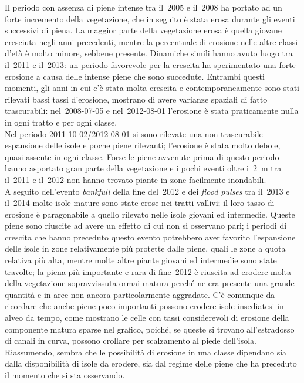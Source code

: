 Il periodo con assenza di piene intense tra il~2005 e il~2008 ha portato ad un forte incremento della vegetazione, che in seguito è stata erosa durante gli eventi successivi di piena.
La maggior parte della vegetazione erosa è quella giovane cresciuta negli anni precedenti, mentre la percentuale di erosione nelle altre classi d'età è molto minore, sebbene presente.
Dinamiche simili hanno avuto luogo tra il~2011 e il~2013: un periodo favorevole per la crescita ha sperimentato una forte erosione a causa delle intense piene che sono succedute.
Entrambi questi momenti, gli anni in cui c'è stata molta crescita e contemporaneamente sono stati rilevati bassi tassi d'erosione, mostrano di avere varianze spaziali di fatto trascurabili: nel~2008-07-05 e nel~2012-08-01 l'erosione è stata praticamente nulla in ogni tratto e per ogni classe.
\\
Nel periodo 2011-10-02/2012-08-01 si sono rilevate una non trascurabile espansione delle isole e poche piene rilevanti; l'erosione è stata molto debole, quasi assente in ogni classe. Forse le piene avvenute prima di questo periodo hanno asportato gran parte della vegetazione e i pochi eventi oltre i~\SI{2}{\m} tra il~2011 e il~2012 non hanno trovato piante in zone facilmente inondabili.
\\
A seguito dell'evento \emph{bankfull} della fine del~2012 e dei \emph{flood pulses} tra il~2013 e il~2014 molte isole mature sono state erose nei tratti vallivi; il loro tasso di erosione è paragonabile a quello rilevato nelle isole giovani ed intermedie. Queste piene sono riuscite ad avere un effetto di cui non si osservano pari; i periodi di crescita che hanno preceduto questo evento potrebbero aver favorito l'espansione delle isole in zone relativamente più protette dalle piene, quali le zone a quota relativa più alta, mentre molte altre piante giovani ed intermedie sono state travolte; la piena più importante e rara di fine~2012 è riuscita ad erodere molta della vegetazione sopravvissuta ormai matura perché ne era presente una grande quantità e in aree non ancora particolarmente aggradate.
C'è comunque da ricordare che anche piene poco importanti possono erodere isole insediatesi in alveo da tempo, come mostrano le celle con tassi considerevoli di erosione della componente matura sparse nel grafico, poiché, se queste si trovano all'estradosso di canali in curva, possono crollare per scalzamento al piede dell'isola.
\\
Riassumendo, sembra che le possibilità di erosione in una classe dipendano sia dalla disponibilità di isole da erodere, sia dal regime delle piene che ha preceduto il momento che si sta osservando.

